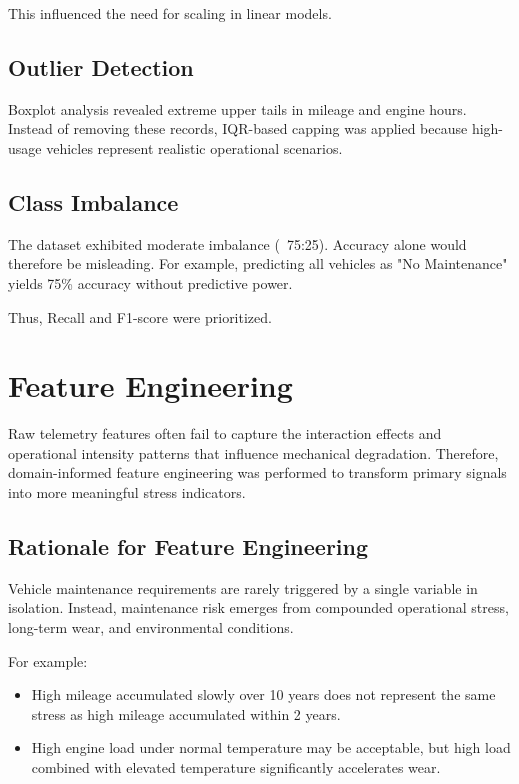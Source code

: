 \documentclass[12pt, a4paper]{article}
\begin{document}
This influenced the need for scaling in linear models.

\subsection{Outlier Detection}

Boxplot analysis revealed extreme upper tails in mileage and engine hours. Instead of removing these records, IQR-based capping was applied because high-usage vehicles represent realistic operational scenarios.

\subsection{Class Imbalance}

The dataset exhibited moderate imbalance (~75:25). Accuracy alone would therefore be misleading. For example, predicting all vehicles as "No Maintenance" yields 75\% accuracy without predictive power.

Thus, Recall and F1-score were prioritized.

\newpage
\section{Feature Engineering}

Raw telemetry features often fail to capture the interaction effects and operational intensity patterns that influence mechanical degradation. Therefore, domain-informed feature engineering was performed to transform primary signals into more meaningful stress indicators.

\subsection{Rationale for Feature Engineering}

Vehicle maintenance requirements are rarely triggered by a single variable in isolation. Instead, maintenance risk emerges from compounded operational stress, long-term wear, and environmental conditions. 

For example:
\begin{itemize}
\item High mileage accumulated slowly over 10 years does not represent the same stress as high mileage accumulated within 2 years.
\item High engine load under normal temperature may be acceptable, but high load combined with elevated temperature significantly accelerates wear.
\end{itemize}
\end{document}
